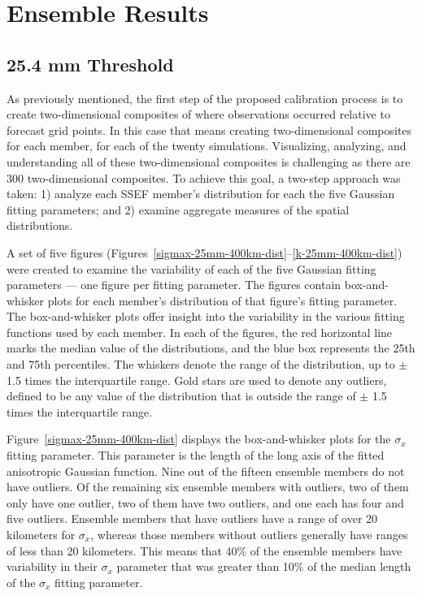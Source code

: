 

\section{Ensemble Results}
\label{eresults}




\subsection{25.4 mm Threshold}
\label{eresults_25.4mm}

As previously mentioned, the first step of the proposed calibration process is to create two-dimensional composites of where observations occurred relative to forecast grid points.
In this case that means creating two-dimensional composites for each member, for each of the twenty simulations.
Visualizing, analyzing, and understanding all of these two-dimensional composites is challenging as there are 300 two-dimensional composites.
To achieve this goal, a two-step approach was taken: 1) analyze each SSEF member's distribution for each the five Gaussian fitting parameters; and 2) examine aggregate measures of the spatial distributions.


A set of five figures (\mbox{Figures \ref{sigmax-25mm-400km-dist}--\ref{k-25mm-400km-dist}}) were created to examine the variability of each of the five Gaussian fitting parameters --- one figure per fitting parameter.
The figures contain box-and-whisker plots for each member's distribution of that figure's fitting parameter.
The box-and-whisker plots offer insight into the variability in the various fitting functions used by each member.
In each of the figures, the red horizontal line marks the median value of the distributions, and the blue box represents the 25th and 75th percentiles.
The whiskers denote the range of the distribution, up to $\pm$ 1.5 times the interquartile range.
Gold stars are used to denote any outliers, defined to be any value of the distribution that is outside the range of $\pm$ 1.5 times the interquartile range.


\mbox{Figure \ref{sigmax-25mm-400km-dist}} displays the box-and-whisker plots for the $\sigma_x$ fitting parameter.
This parameter is the length of the long axis of the fitted anisotropic Gaussian function.
Nine out of the fifteen ensemble members do not have outliers.
Of the remaining six ensemble members with outliers, two of them only have one outlier, two of them have two outliers, and one each has four and five outliers.
Ensemble members that have outliers have a range of over 20 kilometers for $\sigma_x$, whereas those members without outliers generally have ranges of less than 20 kilometers.
This means that 40\% of the ensemble members have variability in their $\sigma_x$ parameter that was greater than 10\% of the median length of the $\sigma_x$ fitting parameter.


